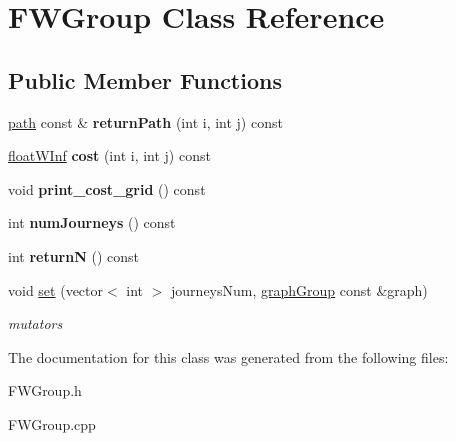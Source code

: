 \hypertarget{classFWGroup}{
\section{FWGroup Class Reference}
\label{classFWGroup}
}
\subsection*{Public Member Functions}
\begin{DoxyCompactItemize}
\item 
\hypertarget{classFWGroup_a0a58466f74e0fd3a760400265ac583df}{
\hyperlink{classpath}{path} const \& {\bfseries returnPath} (int i, int j) const }
\label{classFWGroup_a0a58466f74e0fd3a760400265ac583df}

\item 
\hypertarget{classFWGroup_a227ee75a31b53a8dd8448c2c072fe2ad}{
\hyperlink{classfloatWInf}{floatWInf} {\bfseries cost} (int i, int j) const }
\label{classFWGroup_a227ee75a31b53a8dd8448c2c072fe2ad}

\item 
\hypertarget{classFWGroup_ae6e752366626cf1afe38d359fe70b141}{
void {\bfseries print\_\-cost\_\-grid} () const }
\label{classFWGroup_ae6e752366626cf1afe38d359fe70b141}

\item 
\hypertarget{classFWGroup_ad15bf97b64470191775f1d6ffdaa84ad}{
int {\bfseries numJourneys} () const }
\label{classFWGroup_ad15bf97b64470191775f1d6ffdaa84ad}

\item 
\hypertarget{classFWGroup_a99ae2f69581cd7c7d2a3116e62f99670}{
int {\bfseries returnN} () const }
\label{classFWGroup_a99ae2f69581cd7c7d2a3116e62f99670}

\item 
\hypertarget{classFWGroup_abade8bf9af5bfd80c488a74913e68cde}{
void \hyperlink{classFWGroup_abade8bf9af5bfd80c488a74913e68cde}{set} (vector$<$ int $>$ journeysNum, \hyperlink{classgraphGroup}{graphGroup} const \&graph)}
\label{classFWGroup_abade8bf9af5bfd80c488a74913e68cde}

\begin{DoxyCompactList}\small\item\em mutators \end{DoxyCompactList}\end{DoxyCompactItemize}


The documentation for this class was generated from the following files:\begin{DoxyCompactItemize}
\item 
FWGroup.h\item 
FWGroup.cpp\end{DoxyCompactItemize}
